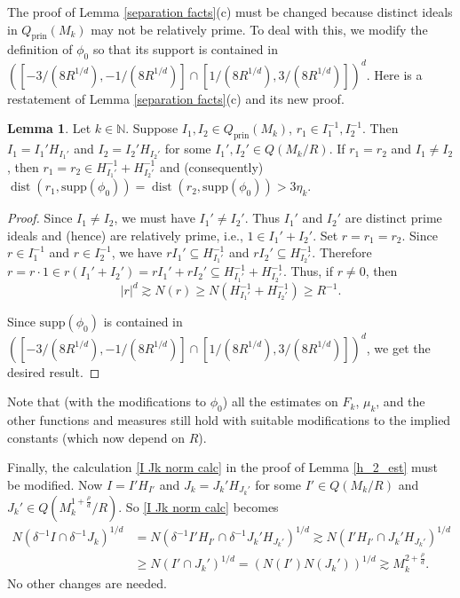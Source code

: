 \documentclass{amsart}
\numberwithin{equation}{section}
\theoremstyle{definition}
\newtheorem{lemma}[theorem]{Lemma}
\theoremstyle{definition}
\def\supp{\mathrm{supp}}
\newcommand{\prin}{\mathrm{prin}}
\DeclareMathOperator{\dist}{dist}
\begin{document}
The proof of Lemma \ref{separation facts}(c) must be changed because distinct ideals in $Q_{\prin}(M_k)$ may not be relatively prime. 
To deal with this, we modify the definition of $\phi_0$ so that its support is contained in $([-3/(8R^{1/d}), -1/(8R^{1/d})] \cap [1/(8R^{1/d}), 3/(8R^{1/d})])^d$. Here is a restatement of Lemma \ref{separation facts}(c) and its new proof. 
\begin{lemma}
Let $k \in \mathbb{N}$. Suppose $I_1, I_2 \in Q_{\prin}(M_k)$, $r_1 \in I_1^{-1}, I_{2}^{-1}$. 
Then $I_1 = I_1' H_{I_1'}$ and $I_2 = I_2' H_{I_2'}$ for some $I_1',I_2' \in Q(M_k/R)$.  
If $r_1 = r_2$ and $I_1 \neq I_2$, then 
$r_1 = r_2 \in H_{I_1'}^{-1} + H_{I_2'}^{-1}$
 and (consequently) 
$\dist(r_1,\supp(\phi_0)) = \dist(r_2,\supp(\phi_0)) > 3\eta_k$. 
\end{lemma}
\begin{proof}
Since $I_1 \neq I_2$, we must have $I_1' \neq I_2'$.  
Thus $I_1'$ and $I_2'$ are distinct prime ideals and (hence) are relatively prime, i.e., $1 \in I_1'+I_2'$. 
Set $r = r_1 = r_2$. 
Since $r \in I_1^{-1}$ and $r \in I_2^{-1}$, we have $r I_1' \subseteq H_{I_1'}^{-1}$ and $r I_2' \subseteq H_{I_2'}^{-1}$. 
Therefore $r = r \cdot 1 \in r(I_1' + I_2') = r I_1' + r I_2' \subseteq H_{I_1'}^{-1} + H_{I_2'}^{-1}$.
Thus, if $r \neq 0$, then 
$$
|r|^d \gtrsim N(r) \geq N(H_{I_1'}^{-1} + H_{I_2'}^{-1}) \geq R^{-1}. 
$$

Since $\supp(\phi_0)$ is contained in $([-3/(8R^{1/d}), -1/(8R^{1/d})] \cap [1/(8R^{1/d}), 3/(8R^{1/d})])^d$, we get the desired result. 
\end{proof} 
%
%
Note that (with the modifications to $\phi_0$)  
all the estimates on $F_k$, $\mu_k$, and the other functions and measures still hold with suitable modifications to the implied constants (which now depend on $R$). 
%

Finally, the calculation  \eqref{I Jk norm calc} in the proof of Lemma \ref{h_2_est} must be modified. 
Now $I = I' H_{I'}$ and $J_k = J_k' H_{J_k'}$ 
for some $I' \in Q(M_k/R)$ and 
$J_k' \in Q(M_k^{1+\frac{\rho}{d}}/R)$. 
So \eqref{I Jk norm calc} becomes 
\begin{align*}
N(\delta^{-1} I \cap \delta^{-1} J_k)^{1/d}
&=
N(\delta^{-1} I' H_{I'} \cap \delta^{-1} J_k' H_{J_k'})^{1/d} 
\gtrsim 
N(I' H_{I'} \cap J_k' H_{J_k'})^{1/d}
\\
&\geq  
N(I' \cap J_k')^{1/d} 
= 
(N(I')N(J_k'))^{1/d}
\gtrsim M_k^{2+\frac{\rho}{d}}.
\end{align*}
No other changes are needed. 












\end{document}
